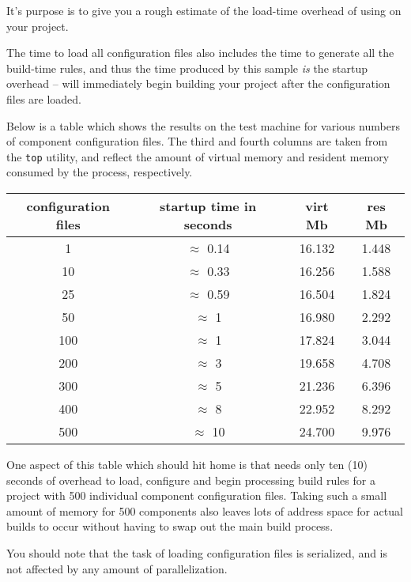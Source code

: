 It's purpose is to give you a rough estimate of the load-time overhead
of using \lmsbw on your project.

The time to load all configuration files also includes the time to
generate all the build-time \make rules, and thus the time produced by
this sample \emph{is} the startup overhead -- \make will immediately
begin building your project after the configuration files are loaded.

Below is a table which shows the results on the test machine for
various numbers of component configuration files.  The third and
fourth columns are taken from the \texttt{top} utility, and reflect
the amount of virtual memory and resident memory consumed by the
process, respectively.

\begin{tabular}{|c|c|c|c|}
  \hline configuration files  & startup time in seconds & virt Mb & res Mb \\
  \hline   1 & $\approx$ 0.14  & 16.132 & 1.448 \\
  \hline  10 & $\approx$ 0.33  & 16.256 & 1.588 \\
  \hline  25 & $\approx$ 0.59  & 16.504 & 1.824 \\
  \hline  50 & $\approx$ 1  & 16.980 & 2.292 \\
  \hline 100 & $\approx$ 1  & 17.824 & 3.044 \\
  \hline 200 & $\approx$ 3  & 19.658 & 4.708 \\
  \hline 300 & $\approx$ 5  & 21.236 & 6.396 \\
  \hline 400 & $\approx$ 8  & 22.952 & 8.292 \\
  \hline 500 & $\approx$ 10 & 24.700 & 9.976 \\
  \hline
\end{tabular}

One aspect of this table which should hit home is that \lmsbw needs
only ten (10) seconds of overhead to load, configure and begin
processing build rules for a project with 500 individual component
configuration files.  Taking such a small amount of memory for 500
components also leaves lots of address space for actual builds to
occur without having to swap out the main build process.

You should note that the task of loading configuration files is
serialized, and is not affected by any amount of parallelization.

